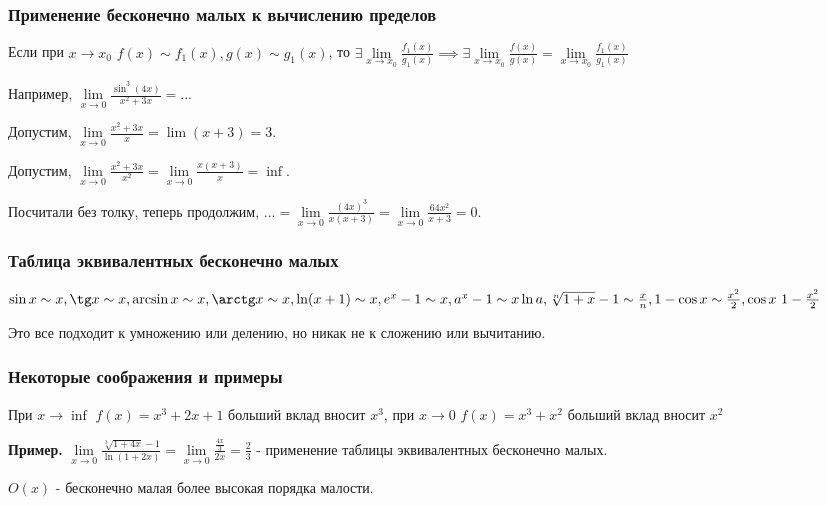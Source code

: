 \documentclass{article}
\begin{document}
\begin{flushleft}
\subsubsection{Применение бесконечно малых к вычислению пределов}

Если при $x \to x_0$  $f(x) \sim f_1(x), g(x) \sim g_1(x)$, то $\exists \lim\limits_{x \to x_0} \frac{f_1(x)}{g_1(x)} \implies \exists \lim\limits_{x \to x_0} \frac{f(x)}{g(x)} = \lim\limits_{x \to x_0} \frac{f_1(x)}{g_1(x)}$ 

\hfill

Например, $\lim\limits_{x \to 0} \frac{\sin^3 (4x)}{x^2 + 3x} = ...$

Допустим, $\lim\limits_{x \to 0} \frac{x^2 + 3x}{x} = \lim (x+3) = 3$.

Допустим, $\lim\limits_{x \to 0} \frac{x^2 + 3x}{x^2} = \lim\limits_{x \to 0} \frac{x(x + 3)}{x} = \inf$.

Посчитали без толку, теперь продолжим, $... = \lim\limits_{x \to 0} \frac{(4x)^3}{x(x + 3)} = \lim\limits_{x \to 0} \frac{64x^2}{x + 3} = 0$.

\subsubsection{Таблица эквивалентных бесконечно малых}

$\sin x \sim x, \tg x \sim x, \arcsin x \sim x, \arctg x \sim x, \ln (x + 1) \sim x, e^x - 1 \sim x, a^x - 1 \sim x \ln a, \sqrt[n]{1 + x} - 1 \sim \frac{x}{n}, 1 - \cos x \sim \frac{x^2}{2}, \cos x ~ 1 - \frac{x^2}{2}$

Это все подходит к умножению или делению, но никак не к сложению или вычитанию.

\subsubsection{Некоторые соображения и примеры}

При $x \to \inf$ $f(x) = x^3 + 2x + 1$ больший вклад вносит $x^3$, при $x \to 0$ $f(x) = x^3 + x^2$ больший вклад вносит $x^2$

\hfill 

\textbf{Пример.} $\lim\limits_{x \to 0} \frac{\sqrt[3]{1 + 4x} - 1}{\ln (1 + 2x)} = \lim\limits_{x \to 0} \frac{\frac{4x}{3}}{2x} = \frac{2}{3}$ - применение таблицы эквивалентных бесконечно малых.

\hfill

$O(x)$ - бесконечно малая более высокая порядка малости.


\end{flushleft}
\end{document}
